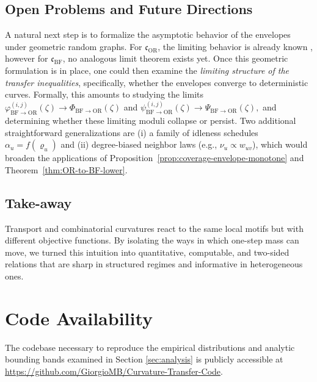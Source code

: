 \documentclass[twoside,11pt]{article}
\numberwithin{equation}{section}
\numberwithin{theorem}{section}
\numberwithin{example}{section}
\begin{document}
\subsection{Open Problems and Future Directions}
A natural next step is to formalize the asymptotic behavior of the envelopes under geometric random graphs. For $\mathfrak c_{\mathrm{OR}}$, the limiting behavior is already known \citep{vanderhoorn_ollivier_2021}, however for $\mathfrak c_{\mathrm{BF}}$, no analogous limit theorem exists yet.
Once this geometric formulation is in place, one could then examine the \emph{limiting structure of the transfer inequalities}, specifically, whether the envelopes converge to deterministic curves. Formally, this amounts to studying the limits
\(
\varphi^{(i,j)}_{\mathrm{BF}\to\mathrm{OR}}(\zeta) \longrightarrow \Phi_{\mathrm{BF}\to\mathrm{OR}}(\zeta)\) and \(\psi^{(i,j)}_{\mathrm{BF}\to\mathrm{OR}}(\zeta) \longrightarrow \Psi_{\mathrm{BF}\to\mathrm{OR}}(\zeta),
\)
and determining whether these limiting moduli collapse or persist.
Two additional straightforward generalizations are (i) a family of idleness schedules $\alpha_u=f(\varrho_u)$ and (ii) degree-biased neighbor laws (e.g., $\nu_u\propto w_{uv}$), which would broaden the applications of Proposition~\ref{prop:coverage-envelope-monotone} and Theorem~\ref{thm:OR-to-BF-lower}.


\subsection{Take-away}
Transport and combinatorial curvatures react to the same local motifs but with different objective functions. By isolating the ways in which one-step mass can move, we turned this intuition into quantitative, computable, and two-sided relations that are sharp in structured regimes and informative in heterogeneous ones. 

\section*{Code Availability}
The codebase necessary to reproduce the empirical distributions and analytic bounding bands examined in Section \ref{sec:analysis} is publicly accessible at \url{https://github.com/GiorgioMB/Curvature-Transfer-Code}.


\newpage
{\footnotesize

}

\newpage

\appendix
\end{document}
